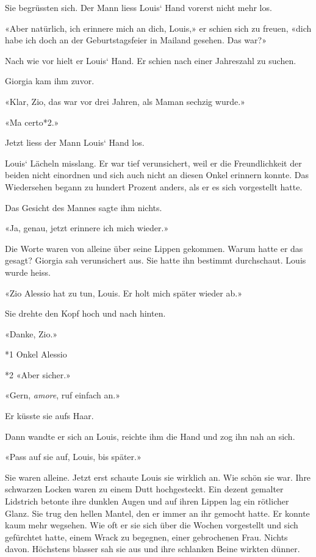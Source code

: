 Sie begrüssten sich. Der Mann liess Louis` Hand vorerst nicht mehr los.

«Aber natürlich, ich erinnere mich an dich, Louis,» er schien sich zu
freuen, «dich habe ich doch an der Geburtstagsfeier in Mailand gesehen.
Das war?»

Nach wie vor hielt er Louis` Hand. Er schien nach einer Jahreszahl zu
suchen.

Giorgia kam ihm zuvor.

«Klar, Zio, das war vor drei Jahren, als Maman sechzig wurde.»

«Ma certo*2.»

Jetzt liess der Mann Louis` Hand los.

Louis` Lächeln misslang. Er war tief verunsichert, weil er die
Freundlichkeit der beiden nicht einordnen und sich auch nicht an diesen
Onkel erinnern konnte. Das Wiedersehen begann zu hundert Prozent anders,
als er es sich vorgestellt hatte.

Das Gesicht des Mannes sagte ihm nichts.

«Ja, genau, jetzt erinnere ich mich wieder.»

Die Worte waren von alleine über seine Lippen gekommen. Warum hatte er
das gesagt? Giorgia sah verunsichert aus. Sie hatte ihn bestimmt
durchschaut. Louis wurde heiss.

«Zio Alessio hat zu tun, Louis. Er holt mich später wieder ab.»

Sie drehte den Kopf hoch und nach hinten.

«Danke, Zio.»

*1 Onkel Alessio

*2 «Aber sicher.»

«Gern, \emph{amore}, ruf einfach an.»

Er küsste sie aufs Haar.

Dann wandte er sich an Louis, reichte ihm die Hand und zog ihn nah an
sich.

«Pass auf sie auf, Louis, bis später.»

Sie waren alleine. Jetzt erst schaute Louis sie wirklich an. Wie schön
sie war. Ihre schwarzen Locken waren zu einem Dutt hochgesteckt. Ein
dezent gemalter Lidstrich betonte ihre dunklen Augen und auf ihren
Lippen lag ein rötlicher Glanz. Sie trug den hellen Mantel, den er immer
an ihr gemocht hatte. Er konnte kaum mehr wegsehen. Wie oft er sie sich
über die Wochen vorgestellt und sich gefürchtet hatte, einem Wrack zu
begegnen, einer gebrochenen Frau. Nichts davon. Höchstens blasser sah
sie aus und ihre schlanken Beine wirkten dünner.

